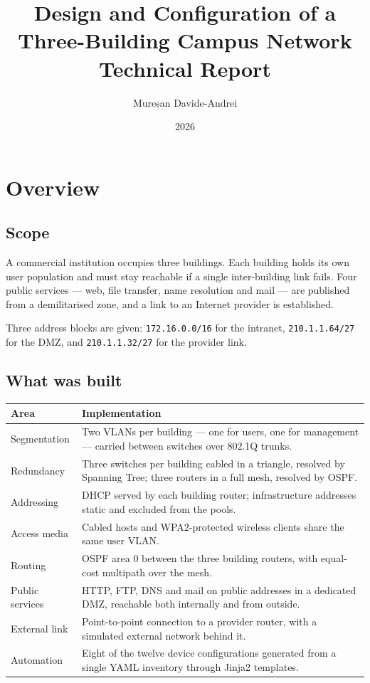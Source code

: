 \documentclass[12pt,a4paper]{article}
\title{%
  \vspace{-1cm}
  \textbf{Design and Configuration of a\\Three-Building Campus Network}\\[8pt]
  \large Technical Report}
\author{Mureșan Davide-Andrei}
\date{2026}
\begin{document}
\maketitle
\thispagestyle{fancy}
\tableofcontents
\newpage

\section{Overview}

\subsection{Scope}

A commercial institution occupies three buildings. Each building holds its own
user population and must stay reachable if a single inter-building link fails.
Four public services --- web, file transfer, name resolution and mail --- are
published from a demilitarised zone, and a link to an Internet provider is
established.

Three address blocks are given: \texttt{172.16.0.0/16} for the intranet,
\texttt{210.1.1.64/27} for the DMZ, and \texttt{210.1.1.32/27} for the provider
link.

\subsection{What was built}

\begin{table}[H]
\centering
\begin{tabular}{@{} l p{9.5cm} @{}}
\toprule
\textbf{Area} & \textbf{Implementation} \\
\midrule
Segmentation & Two VLANs per building --- one for users, one for management ---
  carried between switches over 802.1Q trunks. \\
Redundancy & Three switches per building cabled in a triangle, resolved by
  Spanning Tree; three routers in a full mesh, resolved by OSPF. \\
Addressing & DHCP served by each building router; infrastructure addresses
  static and excluded from the pools. \\
Access media & Cabled hosts and WPA2-protected wireless clients share the same
  user VLAN. \\
Routing & OSPF area 0 between the three building routers, with equal-cost
  multipath over the mesh. \\
Public services & HTTP, FTP, DNS and mail on public addresses in a dedicated
  DMZ, reachable both internally and from outside. \\
External link & Point-to-point connection to a provider router, with a simulated
  external network behind it. \\
Automation & Eight of the twelve device configurations generated from a single
  YAML inventory through Jinja2 templates. \\
\bottomrule
\end{tabular}
\end{table}
\end{document}
